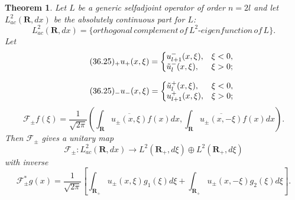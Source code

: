 \documentclass{surv-l}
\theoremstyle{plain}
\newtheorem{theorem}{Theorem}[section]
\theoremstyle{definition}
\numberwithin{equation}{chapter}
\begin{document}
\begin{theorem}\label{thm36.23} Let $L$ be a generic selfadjoint operator of order $n=2l$ and let $L_{ac}^{2}(\mathbf{R}, dx)$ be the absolutely continuous part for $L$:
\setcounter{equation}{23}
\begin{equation}\label{eq36.24}
L_{ac}^{2}(\mathbf{R}, dx)= \{orthogonal\,complement\,of\,L^{2}\text{-}eigenfunction\,of\,L\}.
\end{equation}
Let
\begin{align*}
\tag*{$(36.25)_{+}$} u_{+}(x,\xi)=\left\{\begin{array}{@{}ll@{}}
u_{l+1}^{-}(x, \xi),& \xi<0,\\
\tilde{u}_{l}^{-}(x, \xi),& \xi>0;
\end{array}\right.
\end{align*}

\begin{align*}
\tag*{$(36.25)_{-}$} u_{-}(x, \xi)=\left\{\begin{array}{@{}ll@{}}
\tilde{u}_{l}^{+}(x, \xi),& \xi<0,\\
u_{l+1}^{+}(x,\xi),& \xi>0;
\end{array}\right.
\end{align*}
\setcounter{equation}{25}
\begin{equation}\label{eq36.26}
\mathscr{F}_{\pm}f(\xi)=\frac{1}{\sqrt{2\pi}}\left(\int_{\mathbf{R}}\overline{u_{\pm}(x,\xi)}f(x)dx,\int_{\mathbf{R}}\overline{u_{\pm}(x,-\xi)}f(x) dx\right).
\end{equation}
Then $\mathscr{F}_{\pm}$ gives a unitary map
\begin{equation*}
\mathscr{F}_{\pm}:L_{ac}^{2}(\mathbf{R},dx)\rightarrow L^{2}(\mathbf{R}_{+}, d\xi)\oplus L^{2}(\mathbf{R}_+,d\xi)
\end{equation*}
with inverse
\begin{equation}\label{eq36.27}
\mathscr{F}_{\pm}^{*}g(x)=\frac{1}{\sqrt{2\pi}}\left[\int_{\mathbf{R}_{+}}u_{\pm}(x,\xi)g_{1}(\xi)d\xi+\int_{\mathbf{R}_{+}}u_{\pm}(x,-\xi)g_{2}(\xi)d\xi\right].
\end{equation}
\end{theorem}
\end{document}
